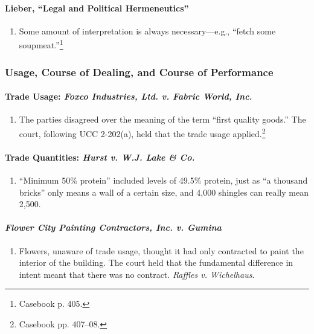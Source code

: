 \paragraph{Lieber, ``Legal and Political Hermeneutics''}

\begin{enumerate}
    \item Some amount of interpretation is always necessary---e.g., ``fetch 
    some soupmeat.''\footnote{Casebook p. 405.}
\end{enumerate}

\subsubsection{Usage, Course of Dealing, and Course of Performance}

\paragraph{Trade Usage: \emph{Foxco Industries, Ltd. v. Fabric World, Inc.}}

\begin{enumerate}
    \item The parties disagreed over the meaning of the term ``first quality 
    goods.'' The court, following UCC 2-202(a), held that the trade usage 
    applied.\footnote{Casebook pp. 407--08.}
\end{enumerate}

\paragraph{Trade Quantities: \emph{Hurst v. W.J. Lake \& Co.}}

\begin{enumerate}
    \item ``Minimum 50\% protein'' included levels of 49.5\% protein, just as 
    ``a thousand bricks'' only means a wall of a certain size, and 4,000 
    shingles can really mean 2,500.
\end{enumerate}

\paragraph{\emph{Flower City Painting Contractors, Inc. v. Gumina}}

\begin{enumerate}
    \item Flowers, unaware of trade usage, thought it had only contracted to 
    paint the interior of the building. The court held that the fundamental 
    difference in intent meant that there was no contract. \emph{Raffles v. 
    Wichelhaus}.
\end{enumerate}

